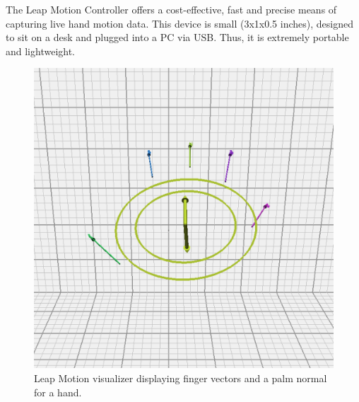 \documentclass[review]{acmsiggraph}
\begin{document}
The Leap Motion Controller offers a cost-effective, fast
and precise means of capturing live hand motion data.
This device is small (3x1x0.5 inches), 
designed to sit on a desk and plugged into a PC via USB. Thus, it is 
extremely portable and lightweight. 

\begin{figure}
\centering
\includegraphics[scale=0.27]{leap-palm-and-fingers.png}
\vspace{-0.1cm}
\caption{Leap Motion visualizer displaying finger vectors and a palm normal for a hand. \label{LeapUI}}
\vspace{-0.5cm}
\end{figure}
\end{document}
